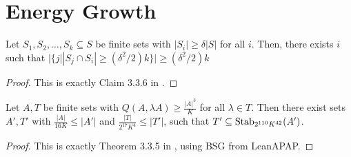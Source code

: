 \chapter{Energy Growth}
\label{chap:egrowth}

\begin{theorem}
    \label{claim336}
    \leanok

    Let $S_1, S_2, \dots, S_k \subseteq S$ be finite sets with $|S_i| \geq \delta |S|$ for all $i$.
    Then, there exists $i$ such that $|\{j | |S_j \cap S_i| \geq (\delta^2 / 2) k\}| \geq (\delta^2 / 2) k$
\end{theorem}

\begin{proof}
    \leanok
    This is exactly Claim 3.3.6 in \cite{}.
\end{proof}

\begin{theorem}
    \label{Theorem335}
    \leanok

    Let $A, T$ be finite sets with $Q(A, \lambda A) \geq \frac{|A|^3}K$ for all $\lambda \in T$.
    Then there exist sets $A', T'$ with $\frac{|A|}{16 K} \leq |A'|$ and
        $\frac{|T|}{2^{17} K^4} \leq |T'|$, such that $T' \subseteq \operatorname{\operatorname{Stab}}_{2^{110} K^{42}}(A')$.
\end{theorem}

\begin{proof}
    \leanok
    This is exactly Theorem 3.3.5 in \cite{}, using BSG from LeanAPAP.
\end{proof}